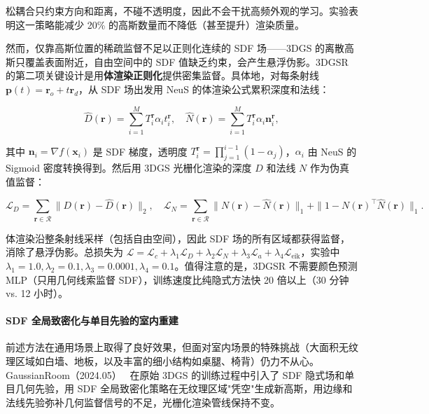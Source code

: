 松耦合只约束方向和距离，不碰不透明度，因此不会干扰高频外观的学习。实验表明这一策略能减少 20\% 的高斯数量而不降低（甚至提升）渲染质量。

然而，仅靠高斯位置的稀疏监督不足以正则化连续的 SDF 场——3DGS 的离散高斯只覆盖表面附近，自由空间中的 SDF 值缺乏约束，会产生悬浮伪影。3DGSR 的第二项关键设计是用\textbf{体渲染正则化}提供密集监督。具体地，对每条射线 $\mathbf{p}(t) = \mathbf{r}_o + t\mathbf{r}_d$，从 SDF 场出发用 NeuS 的体渲染公式累积深度和法线：

\begin{equation}
    \hat{D}(\mathbf{r}) = \sum_{i=1}^{M} T_i^\mathbf{r} \alpha_i t_i^\mathbf{r}, \quad \hat{N}(\mathbf{r}) = \sum_{i=1}^{M} T_i^\mathbf{r} \alpha_i \mathbf{n}_i^\mathbf{r},
\end{equation}

其中 $\mathbf{n}_i = \nabla f(\mathbf{x}_i)$ 是 SDF 梯度，透明度 $T_i^\mathbf{r} = \prod_{j=1}^{i-1}(1-\alpha_j)$，$\alpha_i$ 由 NeuS 的 Sigmoid 密度转换得到。然后用 3DGS 光栅化渲染的深度 $D$ 和法线 $N$ 作为伪真值监督：

\begin{equation}
    \mathcal{L}_{D} = \sum_{\mathbf{r} \in \mathcal{R}}\|D(\mathbf{r}) - \hat{D}(\mathbf{r})\|_2, \quad \mathcal{L}_{N} = \sum_{\mathbf{r} \in \mathcal{R}}\|N(\mathbf{r}) - \hat{N}(\mathbf{r})\|_1 + \|1 - N(\mathbf{r})^\top \hat{N}(\mathbf{r})\|_1.
\end{equation}

体渲染沿整条射线采样（包括自由空间），因此 SDF 场的所有区域都获得监督，消除了悬浮伪影。总损失为 $\mathcal{L} = \mathcal{L}_c + \lambda_1 \mathcal{L}_{D} + \lambda_2 \mathcal{L}_{N} + \lambda_3 \mathcal{L}_a + \lambda_4 \mathcal{L}_{\text{eik}}$，实验中 $\lambda_1=1.0, \lambda_2=0.1, \lambda_3=0.0001, \lambda_4=0.1$。值得注意的是，3DGSR 不需要颜色预测 MLP（只用几何线索监督 SDF），训练速度比纯隐式方法快 20 倍以上（30 分钟 vs. 12 小时）。

\paragraph{SDF 全局致密化与单目先验的室内重建}

前述方法在通用场景上取得了良好效果，但面对室内场景的特殊挑战（大面积无纹理区域如白墙、地板，以及丰富的细小结构如桌腿、椅背）仍力不从心。GaussianRoom（2024.05）~\cite{2405_19671} 在原始 3DGS 的训练过程中引入了 SDF 隐式场和单目几何先验，用 SDF 全局致密化策略在无纹理区域"凭空"生成新高斯，用边缘和法线先验弥补几何监督信号的不足，光栅化渲染管线保持不变。


